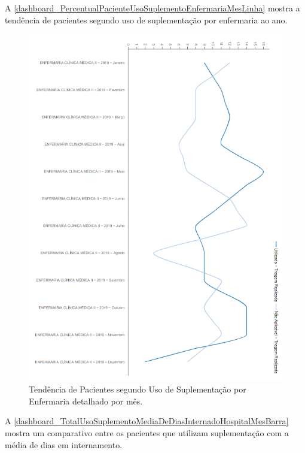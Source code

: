 \newpage
A \autoref{dashboard_PercentualPacienteUsoSuplementoEnfermariaMesLinha} mostra a tendência de pacientes segundo uso de suplementação por enfermaria ao ano.

\begin{figure}[htb]
	\caption{\label{dashboard_PercentualPacienteUsoSuplementoEnfermariaMesLinha}Tendência de Pacientes segundo Uso de Suplementação por Enfermaria detalhado por mês.}
	\begin{center}
	    \includegraphics[scale=0.9]{Imagens/4.4.PercentualPacienteUsoSuplementoEnfermariaMesLinha.png}
	\end{center}
\end{figure}

\newpage
A \autoref{dashboard_TotalUsoSuplementoMediaDeDiasInternadoHospitalMesBarra} mostra um comparativo entre os pacientes que utilizam suplementação com a média de dias em internamento.

